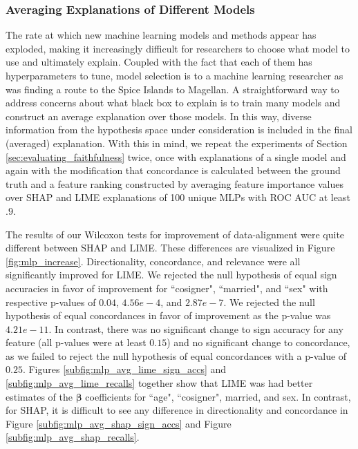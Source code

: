 \documentclass[mnsc,blindrev]{informs3}
\begin{document}
        \subsubsection{Averaging Explanations of Different Models}
            The rate at which new machine learning models and methods appear has exploded, making it increasingly difficult for researchers to choose what model to use and ultimately explain. Coupled with the fact that each of them has hyperparameters to tune, model selection is to a machine learning researcher as was finding a route to the Spice Islands to Magellan. A straightforward way to address concerns about what black box to explain is to train many models and construct an average explanation over those models. In this way, diverse information from the hypothesis space under consideration is included in the final (averaged) explanation.%
            With this in mind, we repeat the experiments of Section \ref{sec:evaluating_faithfulness} twice, once with explanations of a single model and again with the modification that concordance is calculated between the ground truth and a feature ranking constructed by averaging feature importance values over SHAP and LIME explanations of 100 unique MLPs with ROC AUC at least $.9$.
             
            The results of our Wilcoxon tests for improvement of data-alignment were quite different between SHAP and LIME. These differences are visualized in Figure \ref{fig:mlp_increase}. Directionality, concordance, and relevance were all significantly improved for LIME. We rejected the null hypothesis of equal sign accuracies in favor of improvement for ``cosigner", ``married", and ``sex" with respective p-values of $0.04$, $4.56e-4$, and $2.87e-7$. We rejected the null hypothesis of equal concordances in favor of improvement as the p-value was $4.21e-11$. In contrast, there was no significant change to sign accuracy for any feature (all p-values were at least $0.15$) and no significant change to concordance, as we failed to reject the null hypothesis of equal concordances with a p-value of $0.25$. Figures \ref{subfig:mlp_avg_lime_sign_accs} and \ref{subfig:mlp_avg_lime_recalls} together show that LIME was had better estimates of the $\boldsymbol{\beta}$ coefficients for ``age", ``cosigner", married, and sex.  In contrast, for SHAP, it is difficult to see any difference in directionality and concordance in Figure \ref{subfig:mlp_avg_shap_sign_accs} and Figure \ref{subfig:mlp_avg_shap_recalls}. %
            
\end{document}
